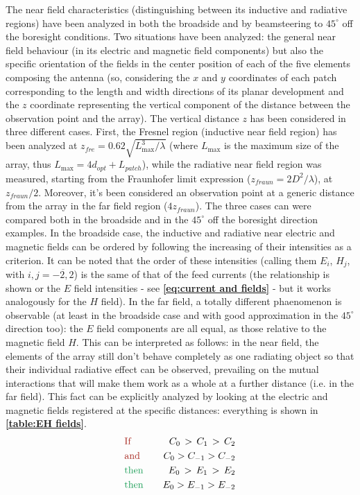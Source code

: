 \documentclass[10 pt,a4paper,twocolumn]{article}
\begin{document}
{The near field characteristics (distinguishing between its inductive and radiative regions) have been analyzed in both the broadside and by beamsteering to $45^\circ$ off the boresight conditions. Two situations have been analyzed: the general near field behaviour (in its electric and magnetic field components) but also the specific orientation of the fields in the center position of each of the five elements composing the antenna (so, considering the $x$ and $y$ coordinates of each patch corresponding to the length and width directions of its planar development and the $z$ coordinate representing the vertical component of the distance between the observation point and the array). The vertical distance $z$ has been considered in three different cases. First, the Fresnel region (inductive near field region) has been analyzed at $z_{fre}=0.62\sqrt{L_{\max}^3/\lambda}$ (where $L_{\max}$ is the maximum size of the array, thus $L_{\max}=4d_{opt}+L_{patch}$), while the radiative near field region was measured, starting from the Fraunhofer limit expression ($z_{fraun}=2D^2/\lambda$), at $z_{fraun}/2$. Moreover, it's been considered an observation point at a generic distance from the array in the far field region ($4z_{fraun}$). The three cases can were compared both in the broadside and in the $45^\circ$ off the boresight direction examples. In the broadside case, the inductive and radiative near electric and magnetic fields can be ordered by following the increasing of their intensities as a criterion. It can be noted that the order of these intensities (calling them $E_i$, $H_j$, with $i,j=\overline{-2,2}$) is the same of that of the feed currents (the relationship is shown or the $E$ field intensities - see \textbf{\cref{eq:current and fields}} - but it works analogously for the $H$ field). In the far field, a totally different phaenomenon is observable (at least in the broadside case and with good approximation in the $45^\circ$ direction too): the $E$ field components are all equal, as those relative to the magnetic field $H$. This can be interpreted as follows: in the near field, the elements of the array still don't behave completely as one radiating object so that their individual radiative effect can be observed, prevailing on the mutual interactions that will make them work as a whole at a further distance (i.e. in the far field). This fact can be explicitly analyzed by looking at the electric and magnetic fields registered at the specific distances: everything is shown in \textbf{\cref{table:EH fields}}.
\begin{equation}
	\begin{aligned}
	&\text{\color{Mahogany}If}\quad &C_0\,>\,C_{1}\,>\,C_2\\
	&\text{\color{Mahogany}and} \quad &C_0>C_{-1}>C_{-2}\\
	&\text{\color{ForestGreen}then} \quad &E_0\,>\,E_{1}\,>\,E_2\\
	&\text{\color{ForestGreen}then} \quad  &E_0>E_{-1}>E_{-2}\\
	\end{aligned}
\label{eq:current and fields}
\end{equation}
}
\end{document}
